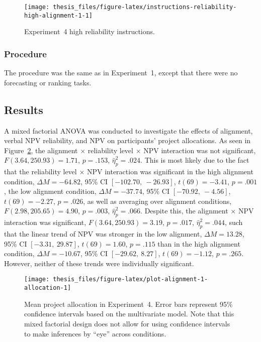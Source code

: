 \documentclass[a4paper, nobind]{templates/ociamthesis}
\theoremstyle{definition}
\theoremstyle{definition}
\theoremstyle{definition}
\theoremstyle{definition}
\theoremstyle{remark}
\begin{document}
\begin{figure}
\texttt{[image: thesis\_files/figure-latex/instructions-reliability-high-alignment-1-1]} \caption{Experiment~4 high reliability instructions.}\label{fig:instructions-reliability-high-alignment-1}
\end{figure}

\subsubsection{Procedure}

The procedure was the same as in Experiment~1, except that there were no
forecasting or ranking tasks.

\hypertarget{results-alignment-1}{%
\subsection{Results}\label{results-alignment-1}}

A mixed factorial ANOVA was conducted to investigate the effects of alignment,
verbal NPV reliability, and NPV on participants' project allocations. As
seen in Figure~\ref{fig:plot-alignment-1-allocation}, the alignment \(\times\)
reliability level \(\times\) NPV interaction was not significant,
\(F(3.64, 250.93) = 1.71\), \(p = .153\), \(\hat{\eta}^2_p = .024\). This
is most likely due to the fact that the reliability level \(\times\) NPV
interaction was significant in the high alignment condition,
\(\Delta M = -64.82\), 95\% CI \([-102.70,~-26.93]\), \(t(69) = -3.41\), \(p = .001\), the low alignment
condition, \(\Delta M = -37.74\), 95\% CI \([-70.92,~-4.56]\), \(t(69) = -2.27\), \(p = .026\), as well as
averaging over alignment conditions,
\(F(2.98, 205.65) = 4.90\), \(p = .003\), \(\hat{\eta}^2_p = .066\). Despite this,
the alignment \(\times\) NPV interaction was significant,
\(F(3.64, 250.93) = 3.19\), \(p = .017\), \(\hat{\eta}^2_p = .044\), such that the linear
trend of NPV was stronger in the low alignment,
\(\Delta M = 13.28\), 95\% CI \([-3.31,~29.87]\), \(t(69) = 1.60\), \(p = .115\) than in the high alignment
condition, \(\Delta M = -10.67\), 95\% CI \([-29.62,~8.27]\), \(t(69) = -1.12\), \(p = .265\). However, neither of
these trends were individually significant.



\begin{figure}
\texttt{[image: thesis\_files/figure-latex/plot-alignment-1-allocation-1]} \caption{Mean project allocation in Experiment~4. Error bars represent 95\% confidence intervals based on the multivariate model. Note that this mixed factorial design does not allow for using confidence intervals to make inferences by ``eye'' across conditions.}\label{fig:plot-alignment-1-allocation}
\end{figure}
\end{document}
